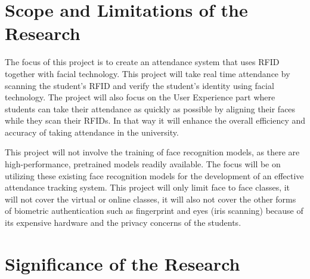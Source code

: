 \section{Scope and Limitations of the Research}
\label{sec:scopelimitations}

The focus of this project is to create an attendance system that uses RFID together with facial technology. This project will take real time attendance by scanning the student's RFID and verify the student's identity using facial technology. The project will also focus on the User Experience part where students can take their attendance as quickly as possible by aligning their faces while they scan their RFIDs. In that way it will enhance the overall efficiency and accuracy of taking attendance in the university.

This project will not involve the training of face recognition models, as there are high-performance, pretrained models readily available. The focus will be on utilizing these existing face recognition models for the development of an effective attendance tracking system. This project will only limit face to face classes, it will not cover the virtual or online classes, it will also not cover the other forms of biometric authentication such as fingerprint and eyes (iris scanning) because of its expensive hardware and the privacy concerns of the students.


\begin{comment}
	This section discusses the boundaries (with respect to the objectives) of the research and the constraints within 
	which the research will be developed.
\end{comment}

\begin{comment}

%
%
Generally, one paragraph should be allotted for each of your research objectives.

Each paragraph contains a brief overview of the concept/theory and the purpose of doing the associated objective.

Each paragraph also includes a description of the scope/limitation of your study.

* Please refer to the slides for examples.

\end{comment}


\section{Significance of the Research}
\label{sec:significance}

